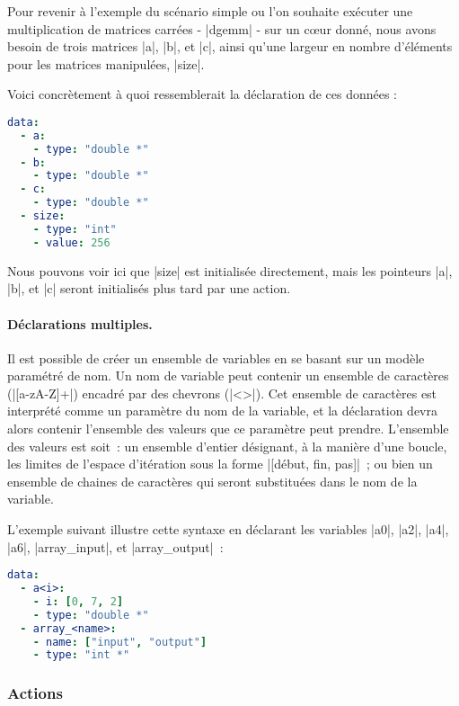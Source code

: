 Pour revenir à l'exemple du scénario simple ou l'on souhaite exécuter une multiplication de matrices carrées - |dgemm| - sur un cœur donné, nous avons besoin de trois matrices |a|, |b|, et |c|, ainsi qu'une largeur en nombre d'éléments pour les matrices manipulées, |size|.

Voici concrètement à quoi ressemblerait la déclaration de ces données :

\begin{lstlisting}[language=yaml,caption=Exemple de déclaration de variables,label=lst:tool:data-example]
data:
  - a:
    - type: "double *"
  - b:
    - type: "double *"
  - c:
    - type: "double *"
  - size:
    - type: "int"
    - value: 256
\end{lstlisting}

Nous pouvons voir ici que |size| est initialisée directement, mais les pointeurs |a|, |b|, et |c| seront initialisés plus tard par une action.

\paragraph{Déclarations multiples.}

Il est possible de créer un ensemble de variables en se basant sur un modèle paramétré de nom.
Un nom de variable peut contenir un ensemble de caractères (|[a-zA-Z]+|) encadré par des chevrons (|<>|).
Cet ensemble de caractères est interprété comme un paramètre du nom de la variable, et la déclaration devra alors contenir l'ensemble des valeurs que ce paramètre peut prendre.
L'ensemble des valeurs est soit~: un ensemble d'entier désignant, à la manière d'une boucle, les limites de l'espace d'itération sous la forme |[début, fin, pas]|~; ou bien un ensemble de chaines de caractères qui seront substituées dans le nom de la variable.

L'exemple suivant illustre cette syntaxe en déclarant les variables |a0|, |a2|, |a4|, |a6|, |array_input|, et |array_output|~:

\begin{lstlisting}[language=yaml,caption=Exemple de déclaration de variables paramètrées,label=lst:tool:data-example-for]
data:
  - a<i>:
    - i: [0, 7, 2]
    - type: "double *"
  - array_<name>:
    - name: ["input", "output"]
    - type: "int *"
\end{lstlisting}



\subsubsection{Actions}

